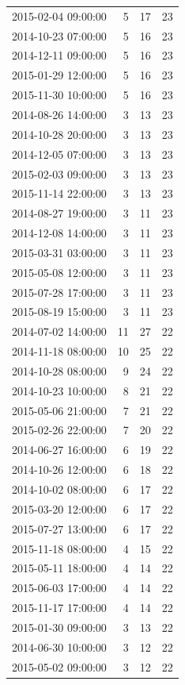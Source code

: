 \begin{tabular}{lrrr}
2015-02-04 09:00:00 & 5 & 17 & 23 \\
2014-10-23 07:00:00 & 5 & 16 & 23 \\
2014-12-11 09:00:00 & 5 & 16 & 23 \\
2015-01-29 12:00:00 & 5 & 16 & 23 \\
2015-11-30 10:00:00 & 5 & 16 & 23 \\
2014-08-26 14:00:00 & 3 & 13 & 23 \\
2014-10-28 20:00:00 & 3 & 13 & 23 \\
2014-12-05 07:00:00 & 3 & 13 & 23 \\
2015-02-03 09:00:00 & 3 & 13 & 23 \\
2015-11-14 22:00:00 & 3 & 13 & 23 \\
2014-08-27 19:00:00 & 3 & 11 & 23 \\
2014-12-08 14:00:00 & 3 & 11 & 23 \\
2015-03-31 03:00:00 & 3 & 11 & 23 \\
2015-05-08 12:00:00 & 3 & 11 & 23 \\
2015-07-28 17:00:00 & 3 & 11 & 23 \\
2015-08-19 15:00:00 & 3 & 11 & 23 \\
2014-07-02 14:00:00 & 11 & 27 & 22 \\
2014-11-18 08:00:00 & 10 & 25 & 22 \\
2014-10-28 08:00:00 & 9 & 24 & 22 \\
2014-10-23 10:00:00 & 8 & 21 & 22 \\
2015-05-06 21:00:00 & 7 & 21 & 22 \\
2015-02-26 22:00:00 & 7 & 20 & 22 \\
2014-06-27 16:00:00 & 6 & 19 & 22 \\
2014-10-26 12:00:00 & 6 & 18 & 22 \\
2014-10-02 08:00:00 & 6 & 17 & 22 \\
2015-03-20 12:00:00 & 6 & 17 & 22 \\
2015-07-27 13:00:00 & 6 & 17 & 22 \\
2015-11-18 08:00:00 & 4 & 15 & 22 \\
2015-05-11 18:00:00 & 4 & 14 & 22 \\
2015-06-03 17:00:00 & 4 & 14 & 22 \\
2015-11-17 17:00:00 & 4 & 14 & 22 \\
2015-01-30 09:00:00 & 3 & 13 & 22 \\
2014-06-30 10:00:00 & 3 & 12 & 22 \\
2015-05-02 09:00:00 & 3 & 12 & 22 \\

\end{tabular}
